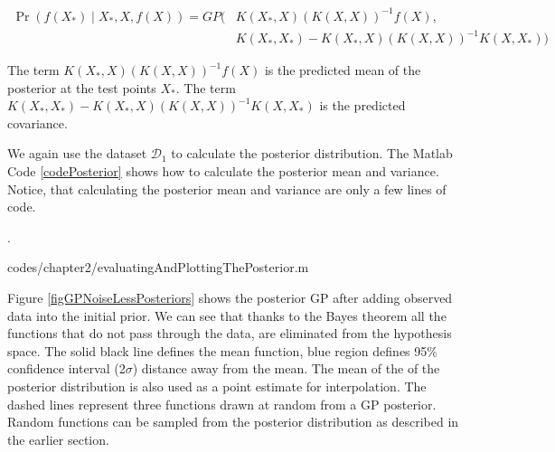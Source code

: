   \begin{equation}\label{eqNoiseFreePosteriorGP}
  \begin{aligned}
  \Pr(f(X_{*}) \mid X_{*}, X, f(X)) = GP(  & K(X_{*}, X)( K(X, X) )^{-1}f(X),   \\ 
                                & K(X_{*}, X_{*}) - K(X_{*}, X)( K(X, X) )^{-1} K(X, X_{*}))
  \end{aligned}
  \end{equation}

The term $K(X_{*}, X)( K(X, X) )^{-1}f(X)$ is the predicted mean of the posterior at the test points $X_{*}$. The term $K(X_{*}, X_{*}) - K(X_{*}, X)( K(X, X) )^{-1} K(X, X_{*})$ is the predicted covariance. 

We again use the dataset $\mathcal{D}_{1}$ to calculate the posterior distribution. The Matlab Code \ref{codePosterior} shows how to calculate the posterior mean and variance. Notice, that calculating the posterior mean and variance are only a few lines of code. 

.%
\begin{mdframed}[hidealllines=true,backgroundcolor=lightgray!20]

                    {codes/chapter2/evaluatingAndPlottingThePosterior.m}
\end{mdframed}

Figure \ref{figGPNoiseLessPosteriors} shows the posterior GP after adding observed data into the initial prior. We can see that thanks to the Bayes theorem all the functions that do not pass through the data, are eliminated from the hypothesis space. The solid black line defines the mean function, blue region defines 95\% confidence interval (2$\sigma$) distance away from the mean. The mean of the of the posterior distribution is also used as a point estimate for interpolation. The dashed lines represent three functions drawn at random from a GP posterior. Random functions can be sampled from the posterior distribution as described in the earlier section. 


